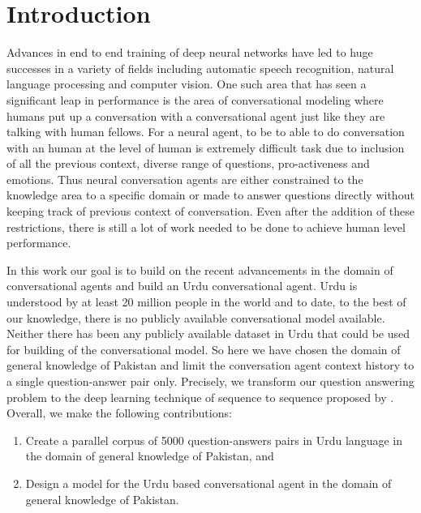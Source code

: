 \documentclass[conference]{IEEEtran}
\begin{document}
\section{Introduction}

Advances in end to end training of deep neural networks have led to huge successes in a variety of fields including automatic speech recognition, natural language processing and computer vision. One such area that has seen a significant leap in performance is the area of conversational modeling where humans put up a conversation with  a conversational agent just like they are talking with human fellows.  For a neural agent, to be to able to do conversation with an human at the level of human is extremely difficult task due to inclusion of all the previous context, diverse range of questions, pro-activeness and emotions. Thus neural conversation agents are either constrained to   the knowledge area to a specific domain or made to answer questions directly without keeping track of previous context of conversation. Even after the addition of these restrictions, there is still a lot of work needed to be done to achieve human level performance. 

In this work our goal is to build on the recent advancements in the domain of conversational agents and build an Urdu conversational agent. Urdu  is understood by at least 20 million people in the world and to date, to the best of our knowledge, there is no publicly available conversational model available. Neither there has been any publicly available dataset in Urdu that could be used for building of the conversational model.  So here we have chosen the domain of general knowledge of Pakistan and limit the conversation agent context history to a single  question-answer pair only.  Precisely, we transform our question answering problem to the deep learning technique of sequence to sequence proposed  by \cite{sutskever2014sequence}. Overall,  we make the following contributions:
 
\begin{enumerate}
\item Create a parallel corpus of 5000 question-answers pairs in Urdu language in the domain of general knowledge of Pakistan, and 
\item Design a model for the Urdu based conversational agent in the domain of general knowledge of Pakistan.
\end{enumerate}
\end{document}
